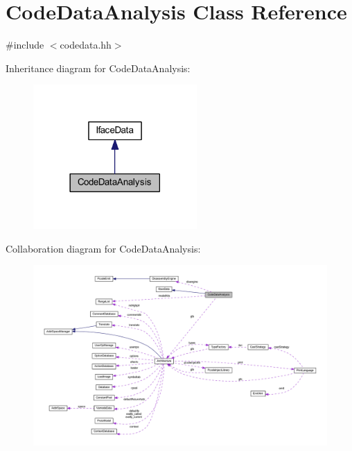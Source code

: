 \hypertarget{class_code_data_analysis}{}\section{Code\+Data\+Analysis Class Reference}
\label{class_code_data_analysis}


{\ttfamily \#include $<$codedata.\+hh$>$}



Inheritance diagram for Code\+Data\+Analysis\+:
\nopagebreak
\begin{figure}[H]
\begin{center}
\leavevmode
\includegraphics[width=177pt]{class_code_data_analysis__inherit__graph}
\end{center}
\end{figure}


Collaboration diagram for Code\+Data\+Analysis\+:
\nopagebreak
\begin{figure}[H]
\begin{center}
\leavevmode
\includegraphics[width=350pt]{class_code_data_analysis__coll__graph}
\end{center}
\end{figure}
